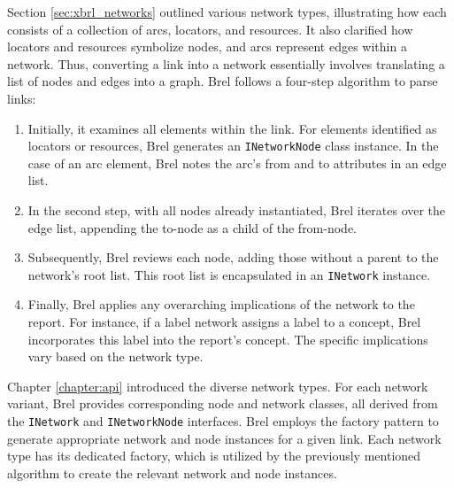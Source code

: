 Section \ref{sec:xbrl_networks} outlined various network types, illustrating how each consists of a collection of arcs, locators, and resources.
It also clarified how locators and resources symbolize nodes, and arcs represent edges within a network.
Thus, converting a link into a network essentially involves translating a list of nodes and edges into a graph.
Brel follows a four-step algorithm to parse links:

\begin{enumerate}\label{enum:network_parsing}
    \item Initially, it examines all elements within the link. 
    For elements identified as locators or resources, Brel generates an \texttt{INetworkNode} class instance.
    In the case of an arc element, Brel notes the arc's from and to attributes in an edge list.
    \item In the second step, with all nodes already instantiated, Brel iterates over the edge list, appending the to-node as a child of the from-node.
    \item Subsequently, Brel reviews each node, adding those without a parent to the network's root list. This root list is encapsulated in an \texttt{INetwork} instance.
    \item Finally, Brel applies any overarching implications of the network to the report.
    For instance, if a label network assigns a label to a concept, Brel incorporates this label into the report's concept.
    The specific implications vary based on the network type.
\end{enumerate}

Chapter \ref{chapter:api} introduced the diverse network types.
For each network variant, Brel provides corresponding node and network classes, 
all derived from the \texttt{INetwork} and \texttt{INetworkNode} interfaces.
Brel employs the factory pattern to generate appropriate network and node instances for a given link.
Each network type has its dedicated factory, which is utilized by the previously mentioned algorithm to create the relevant network and node instances.




